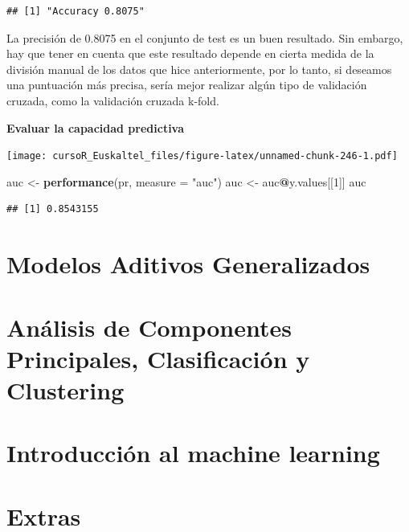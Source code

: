 \documentclass[]{book}
\newenvironment{Shaded}{\begin{snugshade}}{\end{snugshade}}
\newcommand{\KeywordTok}[1]{\textcolor[rgb]{0.13,0.29,0.53}{\textbf{#1}}}
\newcommand{\DataTypeTok}[1]{\textcolor[rgb]{0.13,0.29,0.53}{#1}}
\newcommand{\DecValTok}[1]{\textcolor[rgb]{0.00,0.00,0.81}{#1}}
\newcommand{\StringTok}[1]{\textcolor[rgb]{0.31,0.60,0.02}{#1}}
\newcommand{\OperatorTok}[1]{\textcolor[rgb]{0.81,0.36,0.00}{\textbf{#1}}}
\newcommand{\NormalTok}[1]{#1}
\begin{document}
\begin{verbatim}
## [1] "Accuracy 0.8075"
\end{verbatim}

La precisión de 0.8075 en el conjunto de test es un buen resultado. Sin
embargo, hay que tener en cuenta que este resultado depende en cierta
medida de la división manual de los datos que hice anteriormente, por lo
tanto, si deseamos una puntuación más precisa, sería mejor realizar
algún tipo de validación cruzada, como la validación cruzada k-fold.

\textbf{Evaluar la capacidad predictiva}

\begin{Shaded}
\end{Shaded}

\texttt{[image: cursoR\_Euskaltel\_files/figure-latex/unnamed-chunk-246-1.pdf]}

\begin{Shaded}
\begin{Highlighting}[]
\NormalTok{auc <-}\StringTok{ }\KeywordTok{performance}\NormalTok{(pr, }\DataTypeTok{measure =} \StringTok{"auc"}\NormalTok{)}
\NormalTok{auc <-}\StringTok{ }\NormalTok{auc}\OperatorTok{@}\NormalTok{y.values[[}\DecValTok{1}\NormalTok{]]}
\NormalTok{auc}
\end{Highlighting}
\end{Shaded}

\begin{verbatim}
## [1] 0.8543155
\end{verbatim}

\chapter{Modelos Aditivos
Generalizados}\label{modelos-aditivos-generalizados}

\chapter{Análisis de Componentes Principales, Clasificación y
Clustering}\label{analisis-de-componentes-principales-clasificacion-y-clustering}

\chapter{Introducción al machine
learning}\label{introduccion-al-machine-learning}

\chapter{Extras}\label{extras}


\end{document}
